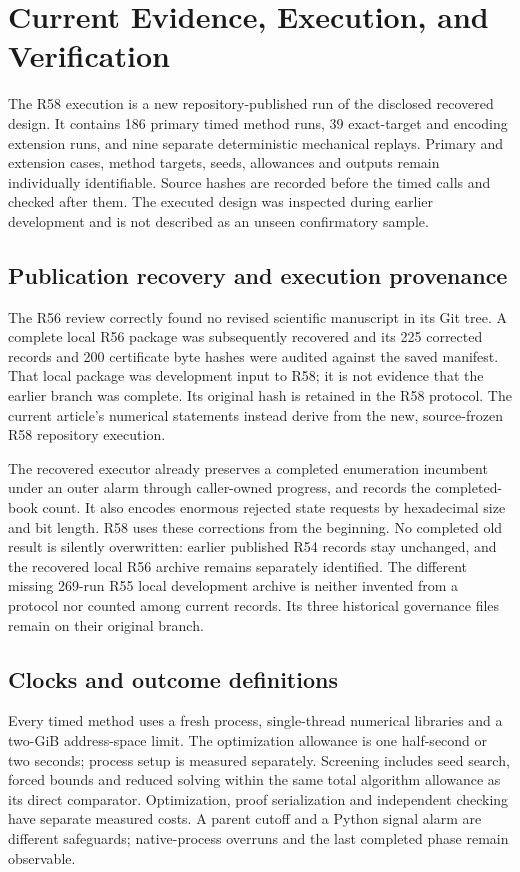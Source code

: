 \section{Current Evidence, Execution, and Verification}\label{ec:execution56}
The R58 execution is a new repository-published run of the disclosed recovered design. It contains 186 primary timed method runs, 39 exact-target and encoding extension runs, and nine separate deterministic mechanical replays. Primary and extension cases, method targets, seeds, allowances and outputs remain individually identifiable. Source hashes are recorded before the timed calls and checked after them. The executed design was inspected during earlier development and is not described as an unseen confirmatory sample.

\subsection{Publication recovery and execution provenance}
The R56 review correctly found no revised scientific manuscript in its Git tree. A complete local R56 package was subsequently recovered and its 225 corrected records and 200 certificate byte hashes were audited against the saved manifest. That local package was development input to R58; it is not evidence that the earlier branch was complete. Its original hash is retained in the R58 protocol. The current article's numerical statements instead derive from the new, source-frozen R58 repository execution.

The recovered executor already preserves a completed enumeration incumbent under an outer alarm through caller-owned progress, and records the completed-book count. It also encodes enormous rejected state requests by hexadecimal size and bit length. R58 uses these corrections from the beginning. No completed old result is silently overwritten: earlier published R54 records stay unchanged, and the recovered local R56 archive remains separately identified. The different missing 269-run R55 local development archive is neither invented from a protocol nor counted among current records. Its three historical governance files remain on their original branch.

\subsection{Clocks and outcome definitions}
Every timed method uses a fresh process, single-thread numerical libraries and a two-GiB address-space limit. The optimization allowance is one half-second or two seconds; process setup is measured separately. Screening includes seed search, forced bounds and reduced solving within the same total algorithm allowance as its direct comparator. Optimization, proof serialization and independent checking have separate measured costs. A parent cutoff and a Python signal alarm are different safeguards; native-process overruns and the last completed phase remain observable.

